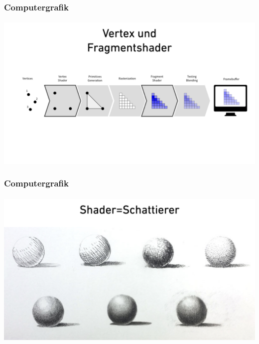 \documentclass{beamer}
\begin{document}
\begin{frame}
    \frametitle{Computergrafik}
\framesubtitle{}

\includegraphics[scale=0.15]{images/Shaderday_Intro/Shaderday_Intro_007}

\end{frame}


\begin{frame}
    \frametitle{Computergrafik}
\framesubtitle{}

\includegraphics[scale=0.15]{images/Shaderday_Intro/Shaderday_Intro_001} 
\end{frame}
\end{document}

